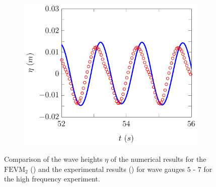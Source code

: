 \begin{figure}
\begin{subfigure}{0.5\textwidth}
	\end{subfigure}
	\begin{subfigure}{0.5\textwidth}
		\includegraphics[width=\textwidth]{./chp6/figures/Experiment/Beji/sh/FEVMWG7.pdf}
		\vspace{0.5cm}
	\end{subfigure}
	\caption{Comparison of the wave heights $\eta$ of the numerical results for the $\text{FEVM}_2$ ({\color{blue}\solidrule}) and the experimental results () for wave gauges $5$ - $7$ for the high frequency experiment.}
	\label{fig:BejishWG5to7FEVM}
\end{figure}


